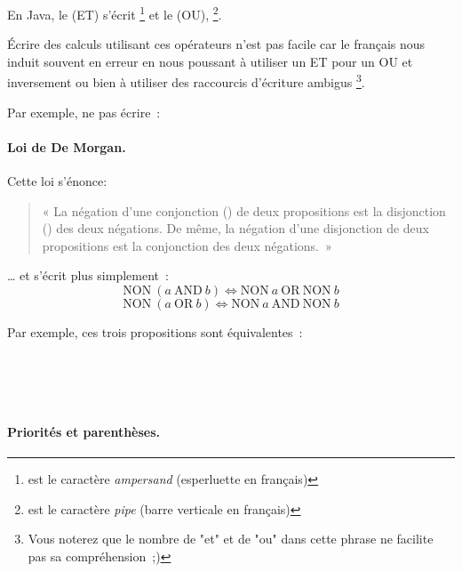 			En Java, le  (ET) s'écrit \pc{\&\&}
			\footnote{\pc{\&} est le caractère \textit{ampersand} (esperluette 
			en français)}
			et le  (OU), \pc{||}
			\footnote{\pc{|} est le caractère \textit{pipe} (barre verticale 
			en français)}.

	
			Écrire des calculs utilisant ces opérateurs n’est pas facile
			car le français nous induit souvent en erreur
			en nous poussant à utiliser un ET pour un OU et inversement
			ou bien à utiliser des raccourcis d’écriture ambigus%
			\footnote{%
				Vous noterez que le nombre de "et" et de "ou"
				dans cette phrase ne facilite pas sa compréhension~;)%
			}. 
			
			Par exemple, ne pas écrire~: 
	
			\paragraph{Loi de De Morgan.}
				Cette loi s'énonce: 
				\begin{quote}
					{\LARGE «}
					La négation d'une conjonction () de deux
					propositions est la disjonction () des deux
					négations. De même, la négation d'une disjonction de deux
					propositions est la conjonction des deux négations.~{\LARGE »}
				\end{quote}

				… et s'écrit plus simplement~:
				\[
					\mathrm{NON}\ (a\ \mathrm{AND}\ b) \Leftrightarrow \mathrm{NON}\ a\ \mathrm{OR}\ \mathrm{NON}\ b
				\]
				\[
					\mathrm{NON}\ (a\ \mathrm{OR}\ b) \Leftrightarrow \mathrm{NON}\ a\ \mathrm{AND}\ \mathrm{NON}\ b
				\]
				
				Par exemple, ces trois propositions sont équivalentes~: 
				
				\begin{center}	
					\large
				\\
				\medskip
				\\
				\medskip
				\\
				\end{center}
	
			\paragraph{Priorités et parenthèses.}

